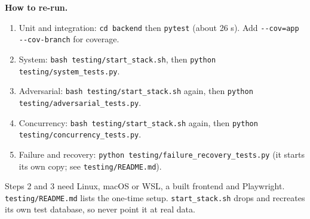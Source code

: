 \textbf{How to re-run.}

\begin{enumerate}
\item Unit and integration: \texttt{cd backend} then \texttt{pytest} (about 26 s). Add \texttt{-\allowbreak{}-\allowbreak{}cov=\allowbreak{}app -\allowbreak{}-\allowbreak{}cov-\allowbreak{}branch} for coverage.
\item System: \texttt{bash testing/\allowbreak{}start\_\allowbreak{}stack.\allowbreak{}sh}, then \texttt{python testing/\allowbreak{}system\_\allowbreak{}tests.\allowbreak{}py}.
\item Adversarial: \texttt{bash testing/\allowbreak{}start\_\allowbreak{}stack.\allowbreak{}sh} again, then \texttt{python testing/\allowbreak{}adversarial\_\allowbreak{}tests.\allowbreak{}py}.
\item Concurrency: \texttt{bash testing/\allowbreak{}start\_\allowbreak{}stack.\allowbreak{}sh} again, then \texttt{python testing/\allowbreak{}concurrency\_\allowbreak{}tests.\allowbreak{}py}.
\item Failure and recovery: \texttt{python testing/\allowbreak{}failure\_\allowbreak{}recovery\_\allowbreak{}tests.\allowbreak{}py} (it starts its own copy; see \texttt{testing/\allowbreak{}README.\allowbreak{}md}).
\end{enumerate}

Steps 2 and 3 need Linux, macOS or WSL, a built frontend and Playwright. \texttt{testing/\allowbreak{}README.\allowbreak{}md} lists the one-time setup. \texttt{start\_\allowbreak{}stack.\allowbreak{}sh} drops and recreates its own test database, so never point it at real data.


